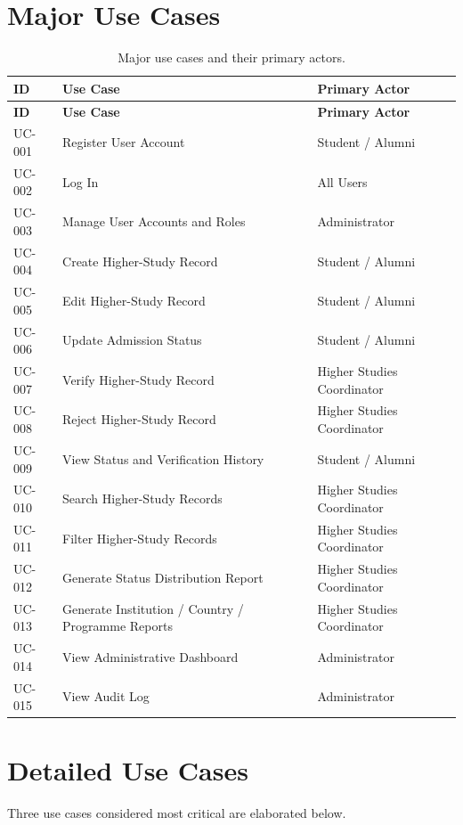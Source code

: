 \documentclass[11pt,a4paper]{article}
\begin{document}
\section{Major Use Cases}
\begin{longtable}{@{}p{1.4cm} p{6.5cm} p{8.0cm}@{}}
\caption{Major use cases and their primary actors.}
\label{tab:uc}
\toprule
\textbf{ID} & \textbf{Use Case} & \textbf{Primary Actor} \\
\midrule
\endfirsthead
\toprule
\textbf{ID} & \textbf{Use Case} & \textbf{Primary Actor} \\
\midrule
\endhead
UC-001 & Register User Account & Student / Alumni \\
UC-002 & Log In & All Users \\
UC-003 & Manage User Accounts and Roles & Administrator \\
UC-004 & Create Higher-Study Record & Student / Alumni \\
UC-005 & Edit Higher-Study Record & Student / Alumni \\
UC-006 & Update Admission Status & Student / Alumni \\
UC-007 & Verify Higher-Study Record & Higher Studies Coordinator \\
UC-008 & Reject Higher-Study Record & Higher Studies Coordinator \\
UC-009 & View Status and Verification History & Student / Alumni \\
UC-010 & Search Higher-Study Records & Higher Studies Coordinator \\
UC-011 & Filter Higher-Study Records & Higher Studies Coordinator \\
UC-012 & Generate Status Distribution Report & Higher Studies Coordinator \\
UC-013 & Generate Institution / Country / Programme Reports & Higher Studies Coordinator \\
UC-014 & View Administrative Dashboard & Administrator \\
UC-015 & View Audit Log & Administrator \\
\bottomrule
\end{longtable}

\section{Detailed Use Cases}
Three use cases considered most critical are elaborated below.
\end{document}

